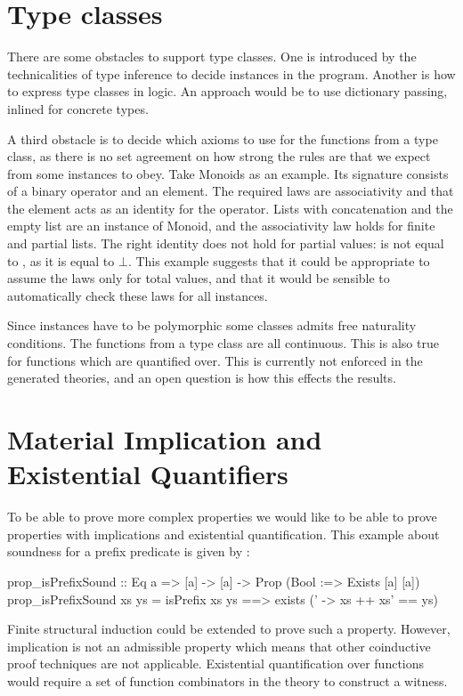 \section{Type classes}
\label{sec:typeclasses}

There are some obstacles to support type classes. One is introduced by
the technicalities of type inference to decide instances in the
program. Another is how to express type classes in logic. An approach
would be to use dictionary passing, inlined for concrete types.

A third obstacle is to decide which axioms to use for the functions
from a type class, as there is no set agreement on how strong the
rules are that we expect from some instances to obey. Take Monoids as
an example. Its signature consists of a binary operator and an
element. The required laws are associativity and that the element acts
as an identity for the operator. Lists with concatenation and the
empty list are an instance of Monoid, and the associativity law holds
for finite and partial lists. The right identity does not hold for
partial values: \hs{$\bot$ ++ []} is not equal to \hs{[]}, as it is
equal to $\bot$. This example suggests that it could be appropriate to
assume the laws only for total values, and that it would be sensible
to automatically check these laws for all instances.

Since instances have to be polymorphic some classes admits free
naturality conditions. The functions from a type class are all
continuous. This is also true for functions which are quantified
over. This is currently not enforced in the generated theories, and an
open question is how this effects the results.

\section{Material Implication and Existential Quantifiers}

To be able to prove more complex properties we would like to be able
to prove properties with implications and existential quantification.
This example about soundness for a prefix predicate is given by
\cite{smallcheck}:

\begin{code}
prop_isPrefixSound :: Eq a => [a] -> [a] -> Prop (Bool :=> Exists [a] [a])
prop_isPrefixSound xs ys = isPrefix xs ys ==> exists (\xs' -> xs ++ xs' == ys)
\end{code}

Finite structural induction could be extended to prove such a
property. However, implication is not an admissible property which
means that other coinductive proof techniques are not
applicable. Existential quantification over functions would require a
set of function combinators in the theory to construct a witness.

